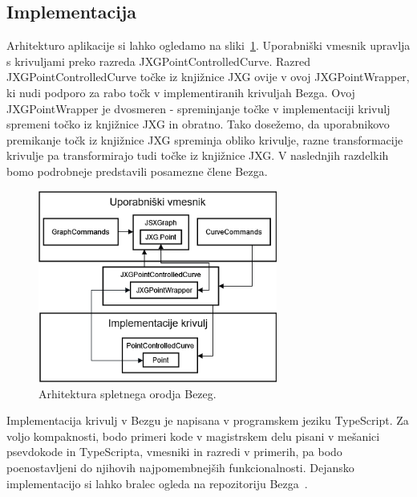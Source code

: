 \documentclass[isrm2, tisk]{fmfdelo}
\begin{document}
    \subsection{Implementacija}
    Arhitekturo aplikacije si lahko ogledamo na sliki~\ref{fig:arhitektura}.
    Uporabniški vmesnik upravlja s krivuljami preko razreda JXGPointControlledCurve.
    Razred JXGPointControlledCurve točke iz knjižnice JXG ovije v ovoj JXGPointWrapper, ki nudi podporo za rabo točk v implementiranih krivuljah Bezga.
    Ovoj JXGPointWrapper je dvosmeren - spreminjanje točke v implementaciji krivulj spremeni točko iz knjižnice JXG in obratno.
    Tako dosežemo, da uporabnikovo premikanje točk iz knjižnice JXG spreminja obliko krivulje, razne transformacije krivulje pa transformirajo tudi točke iz knjižnice JXG.
    V naslednjih razdelkih bomo podrobneje predstavili posamezne člene Bezga.
    \begin{figure}[h!]
        \centering
        \includegraphics[width = 0.70\textwidth]{drawio/actualfinal.drawio}
        \caption{Arhitektura spletnega orodja Bezeg.}
        \label{fig:arhitektura}
    \end{figure}
    \begin{opomba}
        Implementacija krivulj v Bezgu je napisana v programskem jeziku TypeScript.
        Za voljo kompaknosti, bodo primeri kode v magistrskem delu pisani v mešanici psevdokode in TypeScripta,
        vmesniki in razredi v primerih, pa bodo poenostavljeni do njihovih najpomembnejših funkcionalnosti.
        Dejansko implementacijo si lahko bralec ogleda na repozitoriju Bezga~\cite{github-bezeg}.
    \end{opomba}
\end{document}
